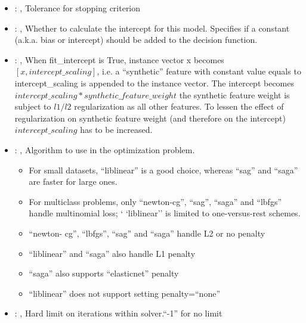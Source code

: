 \begin{itemize}
    \item {}: , 
      Tolerance for stopping criterion

    \item {}: , 
      Whether to calculate the intercept for this model. Specifies if a constant (a.k.a. bias or
      intercept) should be added to the decision function.

    \item {}: , 
      When fit\_intercept is True, instance vector x becomes $[x, intercept\_scaling]$,
      i.e. a “synthetic” feature with constant value equals to intercept\_scaling is appended
      to the instance vector. The intercept becomes $intercept\_scaling * synthetic\_feature\_weight$
      \nb the synthetic feature weight is subject to $l1/l2$ regularization as all other features.
      To lessen the effect of regularization on synthetic feature weight (and therefore on the
      intercept)                                                  $intercept\_scaling$ has to be
      increased.

    \item {}: , 
      Algorithm to use in the optimization problem.
      \begin{itemize}                                                    \item For small datasets,
      ``liblinear'' is a good choice, whereas ``sag'' and ``saga'' are faster for large ones.
      \item For multiclass problems, only ``newton-cg'', ``sag'', ``saga'' and ``lbfgs'' handle
      multinomial loss; `                                                    `liblinear'' is limited
      to one-versus-rest schemes.                                                    \item ``newton-
      cg'', ``lbfgs'', ``sag'' and ``saga'' handle L2 or no penalty
      \item ``liblinear'' and ``saga'' also handle L1 penalty
      \item ``saga'' also supports ``elasticnet'' penalty
      \item ``liblinear'' does not support setting penalty=``none''
      \end{itemize}

    \item {}: , 
      Hard limit on iterations within solver.``-1'' for no limit


\end{itemize}
